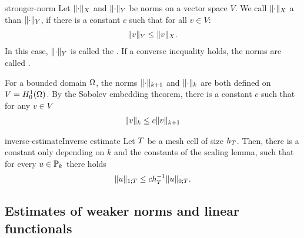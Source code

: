 \begin{Definition}{stronger-norm}
  Let $\norm{\cdot}_X$ and $\norm{\cdot}_Y$ be norms on a vector space
  $V$. We call $\norm{\cdot}_X$ a  than
  $\norm{\cdot}_Y$, if there is a constant $c$ such that for all
  $v\in V$:
  \begin{gather}
    \norm{v}_Y \le \norm{v}_X.
  \end{gather}
  In this case, $\norm{\cdot}_Y$ is called the . If a converse inequality holds, the norms are called
  .
\end{Definition}

\begin{example}
  For a bounded domain $\domain$, the norms $\norm{\cdot}_{k+1}$ and
  $\norm{\cdot}_{k}$ are both defined on $V = H^1_0(\domain)$. By the
  Sobolev embedding theorem, there is a constant $c$ such that for any
  $v\in V$
  \begin{gather*}
    \norm{v}_{k} \le c \norm{v}_{k+1}
  \end{gather*}
\end{example}

\begin{Lemma*}{inverse-estimate}{Inverse estimate}
  Let $\cell$ be a mesh cell of size $h_\cell$. Then, there is a
  constant only depending on $k$ and the constants of the scaling
  lemma, such that for every $u\in \P_k$ there holds
  \begin{gather}
    \norm{u}_{1;\cell} \le c h_T^{-1} \norm{u}_{0;\cell}.
  \end{gather}
\end{Lemma*}



\subsection{Estimates of weaker norms and linear functionals}

